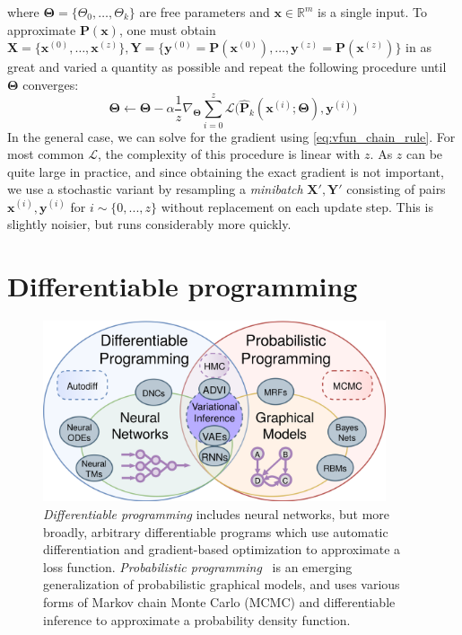 \documentclass[12pt,initial,twoside,maitrise]{dms}
\numberwithin{equation}{section}
\numberwithin{table}{chapter}
\numberwithin{figure}{chapter}
\begin{document}
%
where $\mathbf\Theta = \{\Theta_0, \dots, \Theta_k\}$ are free parameters and $\mathbf{x} \in \mathbb{R}^m$ is a single input. To approximate $\mathbf{P}(\mathbf x)$, one must obtain $\mathbf{X} = \{\mathbf{x}^{(0)}, \dots, \mathbf{x}^{(z)}\}, \mathbf{Y} = \{\mathbf{y}^{(0)} = \mathbf{P}(\mathbf{x}^{(0)}), \dots, \mathbf{y}^{(z)} = \mathbf{P}(\mathbf{x}^{(z)})\}$ in as great and varied a quantity as possible and repeat the following procedure until $\mathbf\Theta$ converges:
%
\begin{equation} \label{eq:stochastic_grad_descent}
    \mathbf\Theta \leftarrow \mathbf\Theta - \alpha\frac{1}{z}\nabla_{\mathbf\Theta} \sum_{i=0}^z\mathcal{L}\big(\mathbf{\hat P}_k(\mathbf{x}^{(i)}; \mathbf{\Theta}), \mathbf{y}^{(i)}\big)
\end{equation}
%
In the general case, we can solve for the gradient using \autoref{eq:vfun_chain_rule}. For most common $\mathcal{L}$, the complexity of this procedure is linear with $z$. As $z$ can be quite large in practice, and since obtaining the exact gradient is not important, we use a stochastic variant by resampling a \textit{minibatch} $\mathbf{X}', \mathbf{Y}'$ consisting of pairs $\mathbf{x}^{(i)}, \mathbf{y}^{(i)}$ for $i \sim \{0, ..., z\}$ without replacement on each update step. This is slightly noisier, but runs considerably more quickly.

\section{Differentiable programming}\label{sec:differentiable-programming}

\begin{figure}
    \centering
    \includegraphics[width=0.90\textwidth]{diff_prob_prog.png}
    \caption{\textit{Differentiable programming} includes neural networks, but more broadly, arbitrary differentiable programs which use automatic differentiation and gradient-based optimization to approximate a loss function. \textit{Probabilistic programming}~\citep{carpenter2017stan, gorinova2018slicstan} is an emerging generalization of probabilistic graphical models, and uses various forms of Markov chain Monte Carlo (MCMC) and differentiable inference to approximate a probability density function.}
    \label{fig:diff_prob_prog}
\end{figure}
\end{document}
